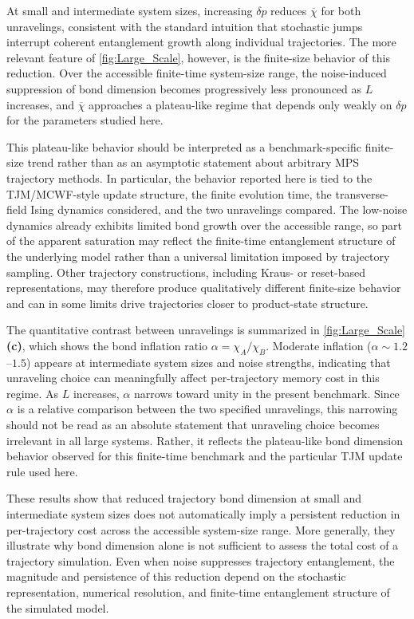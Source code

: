 \documentclass[aps, pra, superscriptaddress, reprint, floatfix]{revtex4-2}
\theoremstyle{plain}
\begin{document}
At small and intermediate system sizes, increasing $\delta p$ reduces $\overline{\chi}$ for both unravelings, consistent with the standard intuition that stochastic jumps interrupt coherent entanglement growth along individual trajectories. The more relevant feature of \cref{fig:Large_Scale}, however, is the finite-size behavior of this reduction. Over the accessible finite-time system-size range, the noise-induced suppression of bond dimension becomes progressively less pronounced as $L$ increases, and $\overline{\chi}$ approaches a plateau-like regime that depends only weakly on $\delta p$ for the parameters studied here.

This plateau-like behavior should be interpreted as a benchmark-specific finite-size trend rather than as an asymptotic statement about arbitrary MPS trajectory methods. In particular, the behavior reported here is tied to the TJM/MCWF-style update structure, the finite evolution time, the transverse-field Ising dynamics considered, and the two unravelings compared. The low-noise dynamics already exhibits limited bond growth over the accessible range, so part of the apparent saturation may reflect the finite-time entanglement structure of the underlying model rather than a universal limitation imposed by trajectory sampling. Other trajectory constructions, including Kraus- or reset-based representations, may therefore produce qualitatively different finite-size behavior and can in some limits drive trajectories closer to product-state structure.

The quantitative contrast between unravelings is summarized in \cref{fig:Large_Scale}\textbf{(c)}, which shows the bond inflation ratio $\alpha = \chi_A/\chi_B$. Moderate inflation ($\alpha \sim 1.2$--$1.5$) appears at intermediate system sizes and noise strengths, indicating that unraveling choice can meaningfully affect per-trajectory memory cost in this regime. As $L$ increases, $\alpha$ narrows toward unity in the present benchmark. Since $\alpha$ is a relative comparison between the two specified unravelings, this narrowing should not be read as an absolute statement that unraveling choice becomes irrelevant in all large systems. Rather, it reflects the plateau-like bond dimension behavior observed for this finite-time benchmark and the particular TJM update rule used here.

These results show that reduced trajectory bond dimension at small and intermediate system sizes does not automatically imply a persistent reduction in per-trajectory cost across the accessible system-size range. More generally, they illustrate why bond dimension alone is not sufficient to assess the total cost of a trajectory simulation. Even when noise suppresses trajectory entanglement, the magnitude and persistence of this reduction depend on the stochastic representation, numerical resolution, and finite-time entanglement structure of the simulated model.
\end{document}
